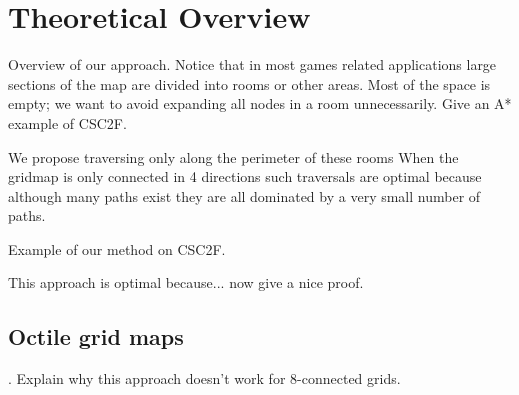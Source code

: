 \section{Theoretical Overview}
Overview of our approach.
Notice that in most games related applications large sections
of the map are divided into rooms or other areas. 
Most of the space is empty; we want to avoid expanding all nodes in 
a room unnecessarily.
Give an A* example of CSC2F. 

We propose traversing only along the perimeter of these rooms
When the gridmap is only connected in 4 directions such traversals
are optimal because although many paths exist they are all dominated
by a very small number of paths.

Example of our method on CSC2F. 

This approach is optimal because... now give a nice proof.

\subsection{Octile grid maps}.
Explain why this approach doesn't work for 8-connected grids.
